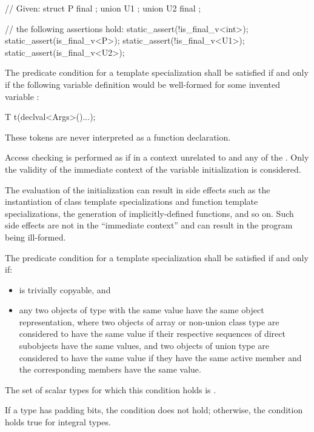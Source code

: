 \pnum
\begin{example}
\begin{codeblock}
// Given:
struct P final { };
union U1 { };
union U2 final { };

// the following assertions hold:
static_assert(!is_final_v<int>);
static_assert(is_final_v<P>);
static_assert(!is_final_v<U1>);
static_assert(is_final_v<U2>);
\end{codeblock}
\end{example}

%
\pnum
The predicate condition for a template specialization
 shall be satisfied if and only if the
following variable definition would be well-formed for some invented variable :
\begin{codeblock}
T t(declval<Args>()...);
\end{codeblock}

\begin{note}
These tokens are never interpreted as a function declaration.
\end{note}
Access checking is performed as if in a context unrelated to 
and any of the . Only the validity of the immediate context of the
variable initialization is considered.
\begin{note}
The evaluation of the
initialization can result in side effects such as the instantiation of class
template specializations and function template specializations, the generation
of implicitly-defined functions, and so on. Such side effects are not in the
``immediate context'' and can result in the program being ill-formed.
\end{note}

%
\pnum
The predicate condition for a template specialization
shall be satisfied if and only if:
\begin{itemize}
\item {} is trivially copyable, and
\item any two objects of type  with the same value
have the same object representation, where
two objects of array or non-union class type are considered to have the same value
if their respective sequences of direct subobjects have the same values, and
two objects of union type are considered to have the same value
if they have the same active member and the corresponding members have the same value.
\end{itemize}
The set of scalar types for which this condition holds is
.
\begin{note}
If a type has padding bits, the condition does not hold;
otherwise, the condition holds true for integral types.
\end{note}

